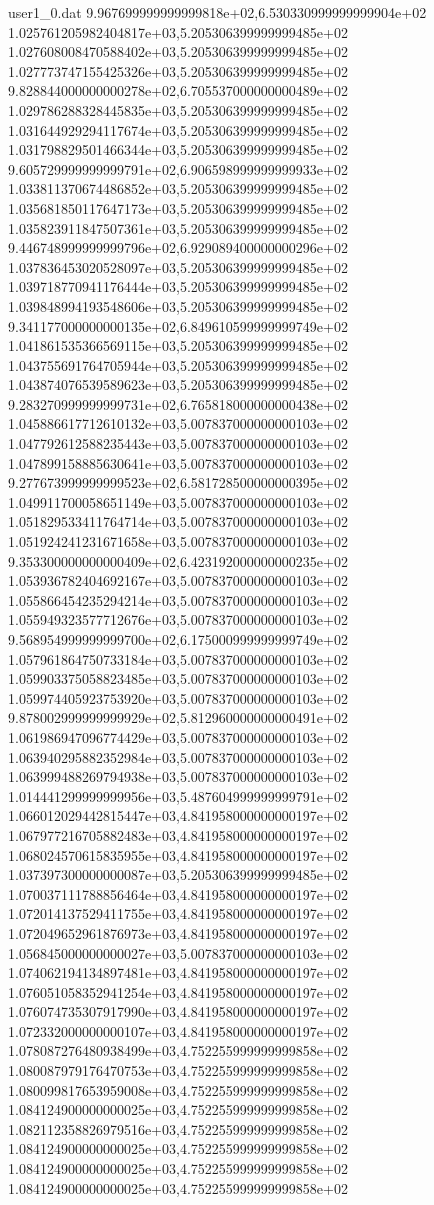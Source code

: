 \begin{filecontents}{user1_0.dat}
9.967699999999999818e+02,6.530330999999999904e+02
1.025761205982404817e+03,5.205306399999999485e+02
1.027608008470588402e+03,5.205306399999999485e+02
1.027773747155425326e+03,5.205306399999999485e+02
9.828844000000000278e+02,6.705537000000000489e+02
1.029786288328445835e+03,5.205306399999999485e+02
1.031644929294117674e+03,5.205306399999999485e+02
1.031798829501466344e+03,5.205306399999999485e+02
9.605729999999999791e+02,6.906598999999999933e+02
1.033811370674486852e+03,5.205306399999999485e+02
1.035681850117647173e+03,5.205306399999999485e+02
1.035823911847507361e+03,5.205306399999999485e+02
9.446748999999999796e+02,6.929089400000000296e+02
1.037836453020528097e+03,5.205306399999999485e+02
1.039718770941176444e+03,5.205306399999999485e+02
1.039848994193548606e+03,5.205306399999999485e+02
9.341177000000000135e+02,6.849610599999999749e+02
1.041861535366569115e+03,5.205306399999999485e+02
1.043755691764705944e+03,5.205306399999999485e+02
1.043874076539589623e+03,5.205306399999999485e+02
9.283270999999999731e+02,6.765818000000000438e+02
1.045886617712610132e+03,5.007837000000000103e+02
1.047792612588235443e+03,5.007837000000000103e+02
1.047899158885630641e+03,5.007837000000000103e+02
9.277673999999999523e+02,6.581728500000000395e+02
1.049911700058651149e+03,5.007837000000000103e+02
1.051829533411764714e+03,5.007837000000000103e+02
1.051924241231671658e+03,5.007837000000000103e+02
9.353300000000000409e+02,6.423192000000000235e+02
1.053936782404692167e+03,5.007837000000000103e+02
1.055866454235294214e+03,5.007837000000000103e+02
1.055949323577712676e+03,5.007837000000000103e+02
9.568954999999999700e+02,6.175000999999999749e+02
1.057961864750733184e+03,5.007837000000000103e+02
1.059903375058823485e+03,5.007837000000000103e+02
1.059974405923753920e+03,5.007837000000000103e+02
9.878002999999999929e+02,5.812960000000000491e+02
1.061986947096774429e+03,5.007837000000000103e+02
1.063940295882352984e+03,5.007837000000000103e+02
1.063999488269794938e+03,5.007837000000000103e+02
1.014441299999999956e+03,5.487604999999999791e+02
1.066012029442815447e+03,4.841958000000000197e+02
1.067977216705882483e+03,4.841958000000000197e+02
1.068024570615835955e+03,4.841958000000000197e+02
1.037397300000000087e+03,5.205306399999999485e+02
1.070037111788856464e+03,4.841958000000000197e+02
1.072014137529411755e+03,4.841958000000000197e+02
1.072049652961876973e+03,4.841958000000000197e+02
1.056845000000000027e+03,5.007837000000000103e+02
1.074062194134897481e+03,4.841958000000000197e+02
1.076051058352941254e+03,4.841958000000000197e+02
1.076074735307917990e+03,4.841958000000000197e+02
1.072332000000000107e+03,4.841958000000000197e+02
1.078087276480938499e+03,4.752255999999999858e+02
1.080087979176470753e+03,4.752255999999999858e+02
1.080099817653959008e+03,4.752255999999999858e+02
1.084124900000000025e+03,4.752255999999999858e+02
1.082112358826979516e+03,4.752255999999999858e+02
1.084124900000000025e+03,4.752255999999999858e+02
1.084124900000000025e+03,4.752255999999999858e+02
1.084124900000000025e+03,4.752255999999999858e+02
\end{filecontents}